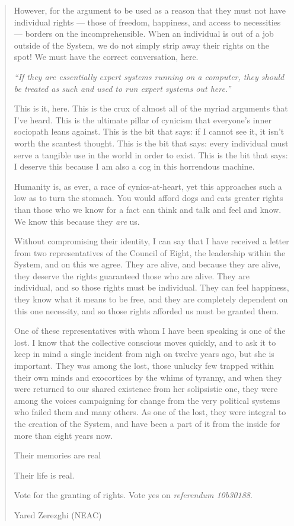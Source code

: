 \begin{quote}
However, for the argument to be used as a reason that they must not have individual rights — those of freedom, happiness, and access to necessities — borders on the incomprehensible. When an individual is out of a job outside of the System, we do not simply strip away their rights on the spot! We must have the correct conversation, here.

\emph{``If they are essentially expert systems running on a computer, they should be treated as such and used to run expert systems out here.''}

This is it, here. This is the crux of almost all of the myriad arguments that I've heard. This is the ultimate pillar of cynicism that everyone's inner sociopath leans against. This is the bit that says: if I cannot see it, it isn't worth the scantest thought. This is the bit that says: every individual must serve a tangible use in the world in order to exist. This is the bit that says: I deserve this because I am also a cog in this horrendous machine.

Humanity is, as ever, a race of cynics-at-heart, yet this approaches such a low as to turn the stomach. You would afford dogs and cats greater rights than those who we know for a fact can think and talk and feel and know. We know this because they \emph{are} us.

Without compromising their identity, I can say that I have received a letter from two representatives of the Council of Eight, the leadership within the System, and on this we agree. They are alive, and because they are alive, they deserve the rights guaranteed those who are alive. They are individual, and so those rights must be individual. They can feel happiness, they know what it means to be free, and they are completely dependent on this one necessity, and so those rights afforded us must be granted them.

One of these representatives with whom I have been speaking is one of the lost. I know that the collective conscious moves quickly, and to ask it to keep in mind a single incident from nigh on twelve years ago, but she is important. They was among the lost, those unlucky few trapped within their own minds and exocortices by the whims of tyranny, and when they were returned to our shared existence from her solipsistic one, they were among the voices campaigning for change from the very political systems who failed them and many others. As one of the lost, they were integral to the creation of the System, and have been a part of it from the inside for more than eight years now.

Their memories are real

Their life is real.

Vote for the granting of rights. Vote yes on \emph{referendum 10b30188}.

Yared Zerezghi (NEAC)
\end{quote}

